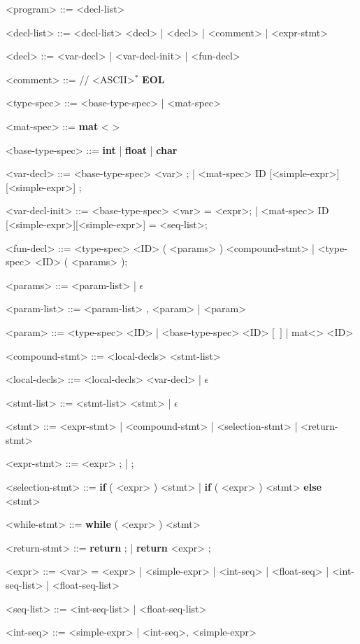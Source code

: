 \begin{grammar}
	<program> ::= <decl-list>

	<decl-list> ::= <decl-list> <decl> | <decl> | <comment> | <expr-stmt>
	
	<decl> ::= <var-decl> | <var-decl-init> | <fun-decl>
	
	<comment> ::= // <ASCII>$^*$ \textbf{EOL}

	<type-spec> ::= <base-type-spec> | <mat-spec>
	
	<mat-spec> ::= \textbf{mat} \textless <base-type-spec> \textgreater 

	<base-type-spec> ::= \textbf{int} | \textbf{float} | \textbf{char}

	<var-decl> ::= <base-type-spec> <var> ; | <mat-spec> ID [<simple-expr>][<simple-expr>] ;
	
	<var-decl-init> ::= <base-type-spec> <var> = <expr>; | <mat-spec> ID [<simple-expr>][<simple-expr>] = {<seq-list>};
	
	<fun-decl> ::= <type-spec> <ID> ( <params> ) <compound-stmt> | <type-spec> <ID> ( <params> );
	
	<params> ::= <param-list> | $\epsilon$
	
	<param-list> ::= <param-list> , <param> | <param> 
	
	<param> ::= <type-spec> <ID> | <base-type-spec> <ID> $[$\ $]$ | mat\textless<type-spec-base>> <ID> 
	
	<compound-stmt> ::= { <local-decls> <stmt-list> } 
	
	<local-decls> ::= <local-decls> <var-decl> | $\epsilon$ 
	
	<stmt-list> ::= <stmt-list> <stmt> | $\epsilon$
	
	<stmt> ::= <expr-stmt> | <compound-stmt> | <selection-stmt> \alt <while-stmt> | <return-stmt> 
	
	<expr-stmt> ::= <expr> ; | ; 
	
	<selection-stmt> ::= \textbf{if} ( <expr> ) <stmt> | \textbf{if} ( <expr> ) <stmt> \textbf{else} <stmt> 
	
	<while-stmt> ::= \textbf{while} ( <expr> ) <stmt> 
	
	<return-stmt> ::= \textbf{return} ; | \textbf{return} <expr> ;
	
	<expr> ::= <var> = <expr> | <simple-expr> | {<int-seq>} | {<float-seq>} | {<int-seq-list>} | {<float-seq-list>}
	
	<seq-list> ::= <int-seq-list> | <float-seq-list>

	<int-seq> ::= <simple-expr> | <int-seq>, <simple-expr>
	

\end{grammar}
